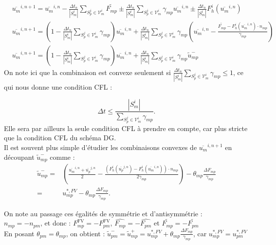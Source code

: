\begin{align*}
&\overline{{u}_m}^{i,n+1} = \overline{{u}_m}^{i,n} - \frac{\Delta t_n}{|S_m^i|} \sum_{S_p^j \in \mathcal{V}_m^i} \widetilde{F_{mp}} 
\pm \frac{\Delta t_n}{|S_m^i|} \sum_{S_p^j \in \mathcal{V}_m^i} \gamma_{mp}\overline{{u}_m}^{i,n} \pm \frac{\Delta t_n}{|S_m^i|} F_h^i(\overline{{u}_m}^{i,n}) \\
&\overline{{u}_m}^{i,n+1}= \left( 1-  \frac{\Delta t_n}{|S_m^i|} \sum_{S_p^j \in \mathcal{V}_m^i} \gamma_{mp}\right) \overline{{u}_m}^{i,n} 
                                + \frac{\Delta t_n}{|S_m^i|} \sum_{S_p^j \in \mathcal{V}_m^i} \gamma_{mp} \left( \overline{{u}_m}^{i,n} - \frac{\widetilde{F_{mp}} -  F_h^i(\overline{{u}_m}^{i,n})\cdot n_{mp} }{\gamma_{mp}} \right) \\
&\overline{{u}_m}^{i,n+1}= \left( 1-  \frac{\Delta t_n}{|S_m^i|} \sum_{S_p^j \in \mathcal{V}_m^i} \gamma_{mp}\right) \overline{{u}_m}^{i,n} 
                                + \frac{\Delta t_n}{|S_m^i|} \sum_{S_p^j \in \mathcal{V}_m^i} \gamma_{mp} \widetilde{{u}}_{mp}^-
\end{align*}
On note ici que la combinaison est convexe seulement si $ \frac{\Delta t_n}{|S_m^i|} \sum_{S_p^j \in \mathcal{V}_m^i} \gamma_{mp} \leq 1$, ce qui nous donne une condition CFL : 

\begin{equation}
    \Delta t \leq \frac{|S_m^i|}{\sum_{S_p^j \in \mathcal{V}_m^i} \gamma_{mp}}.
\end{equation} 
Elle sera par ailleurs la seule condition CFL à prendre en compte, car plus stricte que la condition CFL du schéma DG.\\ 

Il est souvent plus simple d'étudier les combinaisons convexes de $\overline{{u}_m}^{i,n+1}$ en découpant $ \widetilde{{u}}_{mp}^-$ comme : 
\begin{equation}
\begin{aligned}
    \widetilde{{u}}_{mp}^- =& \left( \frac{\overline{{u}_m}^{i,n}+ \overline{{u}_p}^{j,n}}{2} - \frac{(F_h^i(\overline{{u}_p}^{j,n}) - F_h^i(\overline{{u}_m}^{i,n})   )\cdot n_{mp}}{2 \gamma_{mp}}   \right) - \theta_{mp} \frac{\Delta F_{mp}}{\gamma_{mp}} \\
    =& {u}_{mp}^{*,FV} - \theta_{mp} \frac{\Delta F_{mp}}{\gamma_{mp}}.
\end{aligned}    
\end{equation}

On note au passage ces égalités de symmétrie et d'antisymmétrie : \\
$n_{mp}= -n_{pm}$, et donc : $F^{\text{FV}}_{mp} = - F^{\text{FV}}_{pm}$, $\widehat{F_{mp}} = -\widehat{F_{pm}}$ et $\widetilde{F_{mp}} = -\widetilde{F_{pm}}$\\
En posant $\theta_{pm} = \theta_{mp}$, on obtient : $\widetilde{{u}}_{pm}^- = \widetilde{{u}}_{mp}^+ = {u}_{mp}^{*,FV} + \theta_{mp} \frac{\Delta F_{mp}}{\gamma_{mp}}$, car $ {u}_{mp}^{*,FV} = {u}_{pm}^{*,FV}$ \\

